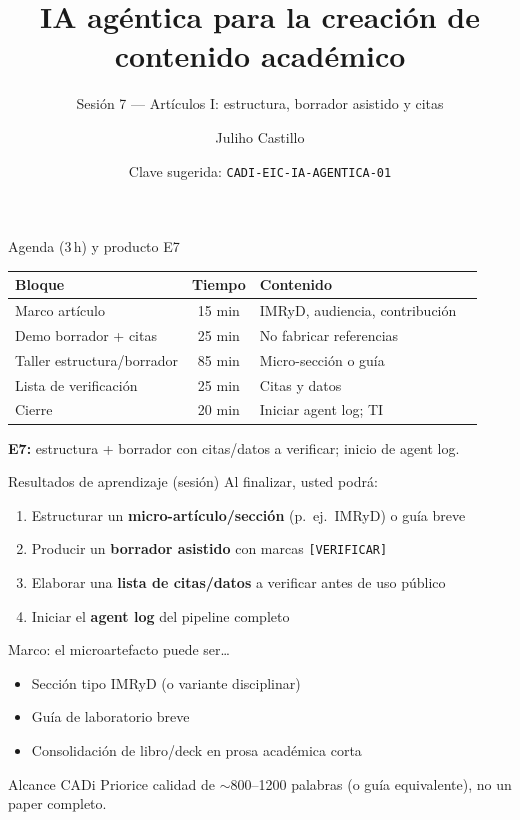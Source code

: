 \documentclass[aspectratio=169,11pt]{beamer}
\title{IA agéntica para la creación de contenido académico}
\subtitle{Sesión 7 --- Artículos I: estructura, borrador asistido y citas}
\author{Juliho Castillo}
\institute{CADi 40\,h · Escuela de Ingeniería y Ciencias\\
Tecnológico de Monterrey}
\date{Clave sugerida: \texttt{CADI-EIC-IA-AGENTICA-01}}
\begin{document}
\begin{frame}
\titlepage
\end{frame}

\begin{frame}{Agenda (3\,h) y producto E7}
\begin{tabularx}{\textwidth}{@{}lclX@{}}
\toprule
Bloque & Tiempo & Contenido \\
\midrule
Marco artículo & 15 min & IMRyD, audiencia, contribución \\
Demo borrador + citas & 25 min & No fabricar referencias \\
Taller estructura/borrador & 85 min & Micro-sección o guía \\
Lista de verificación & 25 min & Citas y datos \\
Cierre & 20 min & Iniciar agent log; TI \\
\bottomrule
\end{tabularx}
\vspace{0.5em}
\textbf{E7:} estructura + borrador con citas/datos a verificar; inicio de agent log.
\end{frame}

\begin{frame}{Resultados de aprendizaje (sesión)}
Al finalizar, usted podrá:
\begin{enumerate}
\item Estructurar un \textbf{micro-artículo/sección} (p.\ ej.\ IMRyD) o guía breve
\item Producir un \textbf{borrador asistido} con marcas \texttt{[VERIFICAR]}
\item Elaborar una \textbf{lista de citas/datos} a verificar antes de uso público
\item Iniciar el \textbf{agent log} del pipeline completo
\end{enumerate}
\end{frame}

\begin{frame}{Marco: el microartefacto puede ser\ldots}
\begin{itemize}
\item Sección tipo IMRyD (o variante disciplinar)
\item Guía de laboratorio breve
\item Consolidación de libro/deck en prosa académica corta
\end{itemize}
\begin{block}{Alcance CADi}
Priorice calidad de $\sim$800--1200 palabras (o guía equivalente), no un paper completo.
\end{block}
\end{frame}
\end{document}
